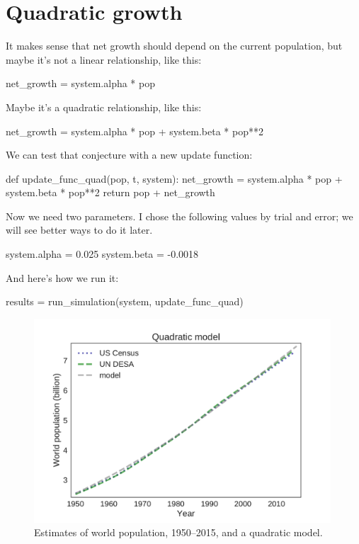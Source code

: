 \documentclass[12pt]{book}
\theoremstyle{exercise}
\begin{document}
\section{Quadratic growth}
\label{quadratic}

It makes sense that net growth should depend on the current population, but maybe it's not a linear relationship, like this:

\begin{python}
    net_growth = system.alpha * pop
\end{python}

Maybe it's a quadratic relationship, like this:


\begin{python}
    net_growth = system.alpha * pop + system.beta * pop**2
\end{python}

We can test that conjecture with a new update function:

\begin{python}
def update_func_quad(pop, t, system):
    net_growth = system.alpha * pop + system.beta * pop**2
    return pop + net_growth
\end{python}

Now we need two parameters.  I chose the following values by trial and error; we will see better ways to do it later.


\begin{python}
system.alpha = 0.025
system.beta = -0.0018
\end{python}

And here's how we run it:

\begin{python}
results = run_simulation(system, update_func_quad)
\end{python}

\begin{figure}
\centerline{\includegraphics[height=3in]{figs/chap03-fig04.pdf}}
\caption{Estimates of world population, 1950--2015, and a quadratic model.}
\label{chap03-fig04}
\end{figure}
\end{document}
